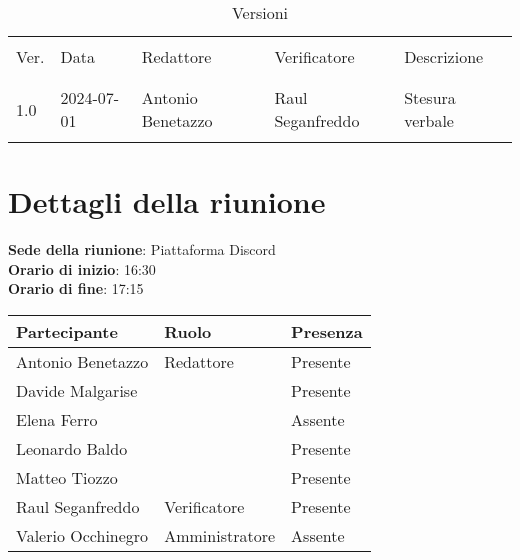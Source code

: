 \documentclass[italian,12pt]{article}
\begin{document}
\newcommand{\mySkip}[1][]{#1}



\newpage



\begin{table}[!h]
	\caption{Versioni}
	\footnotesize
	\begin{center}
		\begin{tabular}{ l l l l p{6cm} }
			\hline                                                                      \\[-2ex]
			Ver. & Data       & Redattore         & Verificatore       & Descrizione     \\
			\\[-2ex] \hline \\[-1.5ex]
			1.0  & 2024-07-01 & Antonio Benetazzo & Raul Seganfreddo   & Stesura verbale \\
			\\[-1.5ex] \hline
		\end{tabular}
	\end{center}
\end{table}

\newpage

\tableofcontents

\newpage

\section{Dettagli della riunione}

\textbf{Sede della riunione}: Piattaforma Discord\\
\textbf{Orario di inizio}: 16:30\\
\textbf{Orario di fine}: 17:15\\

\begin{flushleft}
	\begin{table}[!h]
		\begin{tabular}{ |l|l|l| }
			\hline
			\textbf{Partecipante} & \textbf{Ruolo} & \textbf{Presenza} \\
			\hline
			Antonio Benetazzo     & Redattore      & Presente          \\
			Davide Malgarise      &                & Presente          \\
			Elena Ferro           &                & Assente           \\
			Leonardo Baldo        &                & Presente          \\
			Matteo Tiozzo         &                & Presente          \\
			Raul Seganfreddo      & Verificatore   & Presente          \\
			Valerio Occhinegro    & Amministratore & Assente           \\
			\hline
		\end{tabular}
	\end{table}
\end{flushleft}
\end{document}
